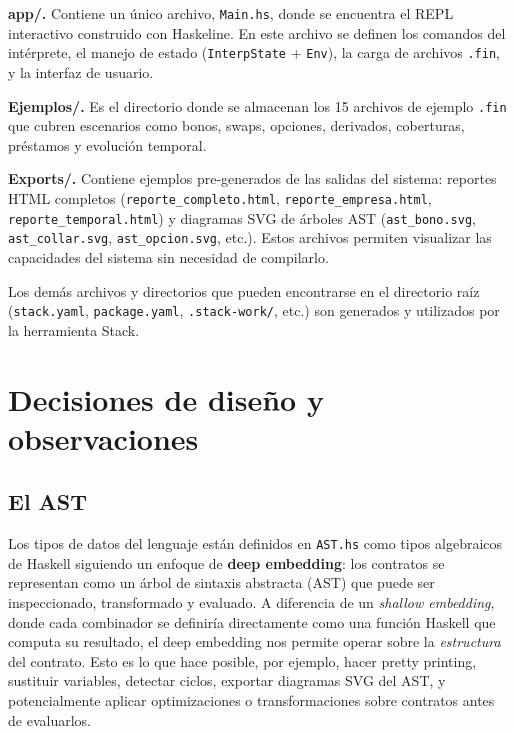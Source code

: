 \documentclass[a4paper, 12pt]{article}
\begin{document}
\textbf{app/.} Contiene un único archivo, \texttt{Main.hs}, donde se encuentra el REPL interactivo construido con Haskeline. En este archivo se definen los comandos del intérprete, el manejo de estado (\texttt{InterpState} + \texttt{Env}), la carga de archivos \texttt{.fin}, y la interfaz de usuario.

\textbf{Ejemplos/.} Es el directorio donde se almacenan los 15 archivos de ejemplo \texttt{.fin} que cubren escenarios como bonos, swaps, opciones, derivados, coberturas, préstamos y evolución temporal.

\textbf{Exports/.} Contiene ejemplos pre-generados de las salidas del sistema: reportes HTML completos (\texttt{reporte\_completo.html}, \texttt{reporte\_empresa.html}, \texttt{reporte\_temporal.html}) y diagramas SVG de árboles AST (\texttt{ast\_bono.svg}, \texttt{ast\_collar.svg}, \texttt{ast\_opcion.svg}, etc.). Estos archivos permiten visualizar las capacidades del sistema sin necesidad de compilarlo.

Los demás archivos y directorios que pueden encontrarse en el directorio raíz (\texttt{stack.yaml}, \texttt{package.yaml}, \texttt{.stack-work/}, etc.) son generados y utilizados por la herramienta Stack.

\section{Decisiones de diseño y observaciones}

\subsection{El AST}

Los tipos de datos del lenguaje están definidos en \texttt{AST.hs} como tipos algebraicos de Haskell siguiendo un enfoque de \textbf{deep embedding}: los contratos se representan como un árbol de sintaxis abstracta (AST) que puede ser inspeccionado, transformado y evaluado. A diferencia de un \textit{shallow embedding}, donde cada combinador se definiría directamente como una función Haskell que computa su resultado, el deep embedding nos permite operar sobre la \textit{estructura} del contrato. Esto es lo que hace posible, por ejemplo, hacer pretty printing, sustituir variables, detectar ciclos, exportar diagramas SVG del AST, y potencialmente aplicar optimizaciones o transformaciones sobre contratos antes de evaluarlos.
\end{document}
